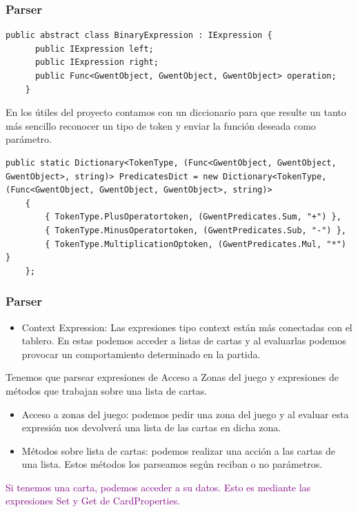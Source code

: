 \documentclass{beamer}
\begin{document}
\begin{frame} [fragile]
  \frametitle{Parser}
  \begin{lstlisting}[language=CSharp,style=MyCsharpstyle]
    public abstract class BinaryExpression : IExpression {
      public IExpression left;
      public IExpression right;
      public Func<GwentObject, GwentObject, GwentObject> operation;
    }
  \end{lstlisting}

  \small En los útiles del proyecto contamos con un diccionario para que resulte un tanto más sencillo reconocer un tipo de token y enviar la función deseada como parámetro.
  \begin{lstlisting}[language=CSharp,style=MyCsharpstyle,basicstyle=\footnotesize]
    public static Dictionary<TokenType, (Func<GwentObject, GwentObject, GwentObject>, string)> PredicatesDict = new Dictionary<TokenType, (Func<GwentObject, GwentObject, GwentObject>, string)>
    {
        { TokenType.PlusOperatortoken, (GwentPredicates.Sum, "+") },
        { TokenType.MinusOperatortoken, (GwentPredicates.Sub, "-") },
        { TokenType.MultiplicationOptoken, (GwentPredicates.Mul, "*") }
    };
  \end{lstlisting}
\end{frame}

\begin{frame}
  \frametitle{Parser}
  \begin{flushleft}
  \begin{itemize}
    \item Context Expression: Las expresiones tipo context están más conectadas con el tablero. En estas podemos acceder a listas de cartas y al evaluarlas podemos provocar un comportamiento determinado en la partida.\\
  \end{itemize}
  Tenemos que parsear expresiones de Acceso a Zonas del juego y expresiones de métodos que trabajan sobre una lista de cartas.
  \begin{itemize}
    \item Acceso a zonas del juego: podemos pedir una zona del juego y al evaluar esta expresión nos devolverá una lista de las cartas en dicha zona. 
    \item Métodos sobre lista de cartas: podemos realizar una acción a las cartas de una lista. Estos métodos los parseamos según reciban o no parámetros.
  \end{itemize}
  \textcolor{purple}{Si tenemos una carta, podemos acceder a su datos. Esto es mediante las expresiones Set y Get de CardProperties.}
  \end{flushleft}
\end{frame}
\end{document}
